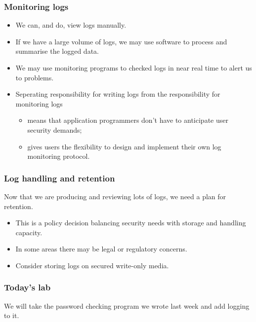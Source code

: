 \documentclass[10pt]{beamer}
\begin{document}
\begin{frame}
  \frametitle{Monitoring  logs}

 \begin{itemize}
  \item We can, and do, view logs manually.
  \item If we have a large volume of logs, we may use software to process and summarise the logged data.
  \item We may use monitoring programs to checked logs in near real time to alert us to problems.
  \item Seperating responsibility for writing logs from the responsibility for monitoring logs
	  \begin{itemize}
		  \item means that application programmers don't have to anticipate user security demands;
		  \item gives users the flexibility to design and implement their own log monitoring protocol.
          \end{itemize}
  \end{itemize}
\end{frame}


\begin{frame}
  \frametitle{Log handling and retention}

 Now that we are producing and reviewing lots of logs, we need a plan for retention.
 \begin{itemize}
  \item This is a policy decision balancing security needs with storage and handling capacity.
  \item In some areas there may be legal or regulatory concerns.
  \item Consider storing logs on secured write-only media.
  \end{itemize}
\end{frame}


\begin{frame}
  \frametitle{Today's lab}

  We will take the password checking program we wrote last week and add logging to it.
\end{frame}
\end{document}
